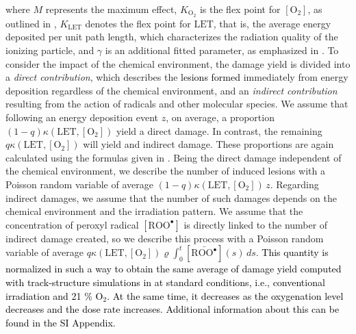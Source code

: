 \documentclass[10pt]{iopart}
\newcommand{\marco}[1]{\textcolor{black}{#1}}
\newcommand{\ema}[1]{\textcolor{black}{#1}}
\numberwithin{table}{section}
\begin{document}
where $M$ represents the maximum effect, $K_{\mathrm{O_2}}$ is the flex point for $[\mathrm{O_2}]$, as outlined in \cite{Epp1972}, $K_{\mathrm{LET}}$ denotes the flex point for $\mathrm{LET}$, that is, the average energy deposited per unit path length, which characterizes the radiation quality of the ionizing particle, and $\gamma$ is an additional fitted parameter, as emphasized in \cite{Scifoni2013}. To consider the impact of the chemical environment, the damage yield is divided into a \textit{direct contribution}, which describes the \ema{lesions formed} immediately from energy deposition regardless of the chemical environment, and an \textit{indirect contribution} resulting from the action of radicals and other molecular species. We assume that following an energy deposition event $z$, on average, a proportion $(1-q) \kappa\left( \mathrm{LET}, [\mathrm{O_2}] \right)$ yield a direct damage. In contrast, the remaining $q \kappa\left( \mathrm{LET}, [\mathrm{O_2}] \right)$ will yield and indirect damage. These proportions are again calculated using the formulas given in \cite{kundrat2020analytical}. Being the direct damage independent of the chemical environment, we describe the number of induced lesions with a Poisson random variable of average $(1-q) \kappa\left( \mathrm{LET}, [\mathrm{O_2}] \right)\,z$. Regarding indirect damages, we assume that the number of such damages depends on the chemical environment and the irradiation pattern. We assume that the concentration of peroxyl radical $[\mathrm{ROO^\bullet}]$ is directly linked to the number of indirect damage created, so we describe this process with a Poisson random variable of average $q \kappa\left( \mathrm{LET}, [\mathrm{O_2}] \right)\varrho \int_{0}^t [\bar{\mathrm{ROO^\bullet}}](s) \,ds$. \marco{This quantity is normalized in such a way to obtain the same average of damage yield computed with track‑structure simulations in \cite{kundrat2020analytical} at standard conditions, i.e., conventional irradiation and 21 \% $\mathrm{O_2}$. At the same time, it decreases as the oxygenation level decreases and the dose rate increases. Additional information about this can be found in the SI Appendix.}
\end{document}
